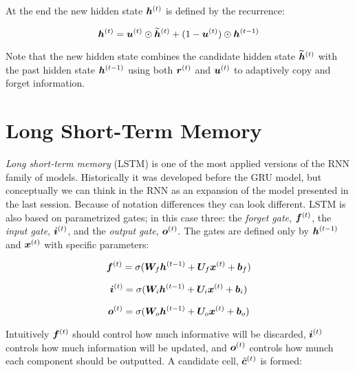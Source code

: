 At the end the new hidden state $\bm{h}^{(t)}$ is defined by the recurrence:

\begin{equation}
\bm{h}^{(t)} = \bm{u}^{(t)} \odot \bm{\widetilde{h}}^{(t)} + (1 - \bm{u}^{(t)}) \odot \bm{h}^{(t-1)} 
\end{equation}

Note that the new hidden state combines the candidate hidden state $\bm{\widetilde{h}}^{(t)}$ with the past hidden state $\bm{h}^{(t-1)}$ using both $\bm{r}^{(t)}$ and $\bm{u}^{(t)}$ to adaptively copy and forget information.

\section{Long Short-Term Memory}
\label{sec:LSTM}


\textit{Long short-term memory} (LSTM) is one of the most applied versions of the RNN family of models. Historically it was developed before the GRU model, but conceptually we can think in the RNN as an expansion of the model presented in the last session. Because of notation differences they can look different. LSTM is also based on parametrized gates; in this case three: the \textit{forget gate}, $\bm{f}^{(t)}$, the \textit{input gate}, $\bm{i}^{(t)}$, and the \textit{output gate}, $\bm{o}^{(t)}$. The gates are defined only by $\bm{h}^{(t-1)}$ and $\bm{x}^{(t)}$ with specific parameters:

\begin{equation}
\bm{f}^{(t)} = \sigma(\bm{W}_{f} \bm{h}^{(t-1)} + \bm{U}_{f} \bm{x}^{(t)} + \bm{b}_{f})
\end{equation}

\begin{equation}
\bm{i}^{(t)} = \sigma(\bm{W}_{i} \bm{h}^{(t-1)} + \bm{U}_{i} \bm{x}^{(t)} + \bm{b}_{i})
\end{equation}

\begin{equation}
\bm{o}^{(t)} = \sigma(\bm{W}_{o} \bm{h}^{(t-1)} + \bm{U}_{o} \bm{x}^{(t)} + \bm{b}_{o})
\end{equation}

Intuitively $\bm{f}^{(t)}$ should control how much informative will be discarded, $\bm{i}^{(t)}$ controls how much information will be updated, and $\bm{o}^{(t)}$ controls how munch each component should be outputted. A candidate cell, $\tilde{\bm{c}}^{(t)}$ is formed:

